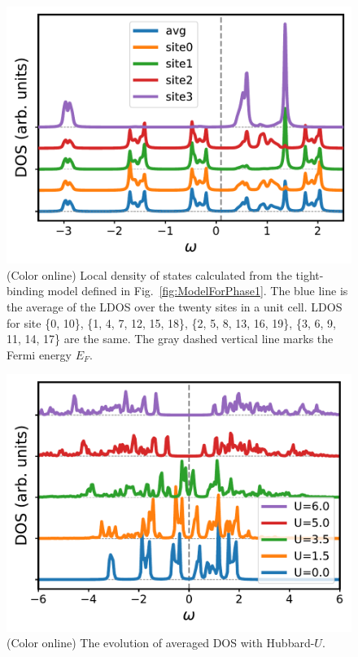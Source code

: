 \documentclass[aps,prb,reprint,amsfonts,amsmath,amssymb,showpacs,groupedaddress,superscriptaddress]{revtex4-1}
\begin{document}
\begin{figure}[p]
    \includegraphics[width=\columnwidth]{fig/TBAForPhase1.pdf}
    \caption{\label{fig:TBAForPhase1} (Color online) Local density of states calculated from the tight-binding model defined in Fig.~\ref{fig:ModelForPhase1}. The blue line is the average of the LDOS over the twenty sites in a unit cell. LDOS for site \{0, 10\}, \{1, 4, 7, 12, 15, 18\}, \{2, 5, 8, 13, 16, 19\}, \{3, 6, 9, 11, 14, 17\} are the same. The gray dashed vertical line marks the Fermi energy $E_{F}$.}
\end{figure}

\begin{figure}[p]
    \includegraphics[width=\columnwidth]{fig/CPTForPhase1.pdf}
    \caption{\label{fig:CPTForPhase1} (Color online) The evolution of averaged DOS with Hubbard-$U$.}
\end{figure}
\end{document}
